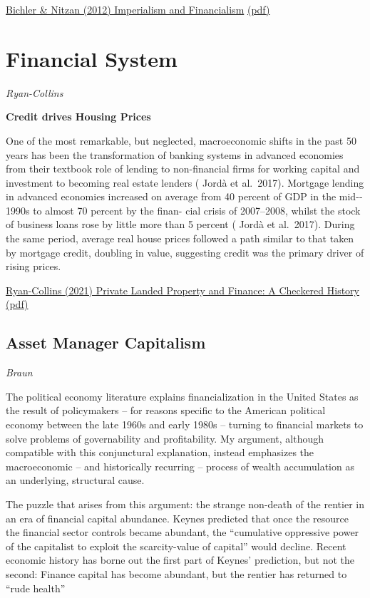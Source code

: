\documentclass[
]{book}
\begin{document}
\href{http://bnarchives.yorku.ca/329/}{Bichler \& Nitzan (2012) Imperialism and Financialism}
\href{pdf/Bichler_Nitzan_2012_Imperialism_and_Financialism.pdf}{(pdf)}

\hypertarget{financial-system}{%
\chapter{Financial System}\label{financial-system}}

\emph{Ryan-Collins}

\textbf{Credit drives Housing Prices}

One of the most remarkable, but
neglected, macroeconomic shifts in the past 50 years has been the
transformation of banking systems in advanced economies from their
textbook role of lending to non-­financial firms for working capital
and investment to becoming real estate lenders ( Jordà et al.~2017).
Mortgage lending in advanced economies increased on average from
40 percent of GDP in the mid-­1990s to almost 70 percent by the finan-
cial crisis of 2007--­2008, whilst the stock of business loans rose by
little more than 5 percent ( Jordà et al.~2017). During the same period,
average real house prices followed a path similar to that taken by
mortgage credit, doubling in value, suggesting credit was the primary
driver of rising prices.

\href{https://onlinelibrary.wi\%20ley.com/doi/10.1111/ajes.12387}{Ryan-Collins (2021) Private Landed Property and Finance: A Checkered History}
\href{pdf/Ryan-Collins_2021_Private_Landed_Property_and_Finance.pdf}{(pdf)}

\hypertarget{asset-manager-capitalism}{%
\section{Asset Manager Capitalism}\label{asset-manager-capitalism}}

\emph{Braun}

The political economy literature explains
financialization in the United States as the result of policymakers -- for reasons specific
to the American political economy between the late 1960s and early 1980s -- turning to
financial markets to solve problems of governability and profitability. My argument,
although compatible with this conjunctural explanation, instead emphasizes the
macroeconomic -- and historically recurring -- process of wealth accumulation as an
underlying, structural cause.

The puzzle that arises from this
argument: the strange non-death of the rentier in an era of financial capital abundance.
Keynes predicted that once the resource the financial sector controls became abundant,
the ``cumulative oppressive power of the capitalist to exploit the scarcity-value of capital''
would decline. Recent economic history has borne out the first part of Keynes' prediction,
but not the second: Finance capital has become abundant, but the rentier has returned
to ``rude health''
\end{document}
